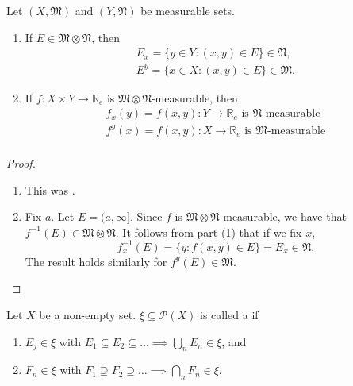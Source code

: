 \documentclass[notoc,notitlepage]{tufte-book}
\begin{document}
\begin{propo}\label{propo:component_wise_measurability_of_functions_and_sets}
  Let $(X, \mathfrak{M})$ and $(Y, \mathfrak{N})$ be measurable sets.
  \begin{enumerate}
    \item If $E \in \mathfrak{M} \otimes \mathfrak{N}$, then
      \begin{gather*}
        E_x = \{ y \in Y : (x, y) \in E \} \in \mathfrak{N}, \\
        E^y = \{ x \in X : (x, y) \in E \} \in \mathfrak{M}.
      \end{gather*}
    \item If $f : X \times Y \to \mathbb{R}_e$ is
      $\mathfrak{M} \otimes \mathfrak{N}$-measurable, then
      \begin{gather*}
        f_x(y) = f(x, y) : Y \to \mathbb{R}_e
          \text{ is } \mathfrak{N}\text{-measurable} \\
        f^y(x) = f(x, y) : X \to \mathbb{R}_e
          \text{ is } \mathfrak{M}\text{-measurable} \\
      \end{gather*}
  \end{enumerate}
\end{propo}

\begin{proof}
  \begin{enumerate}
    \item This was .
    \item Fix $a$. Let $E = (a, \infty]$.
      Since $f$ is $\mathfrak{M} \otimes \mathfrak{N}$-measurable,
      we have that $f^{-1}(E) \in \mathfrak{M} \otimes \mathfrak{N}$.
      It follows from part (1) that if we fix $x$,
      \begin{equation*}
        f_x^{-1}(E) = \{ y : f(x, y) \in E \} = E_x \in \mathfrak{N}.
      \end{equation*}
      The result holds similarly for $f^y(E) \in \mathfrak{M}$.
  \end{enumerate}
\end{proof}

\begin{defn}\label{defn:monotone_classes}
  Let $X$ be a non-empty set.
  $\xi \subseteq \mathcal{P}(X)$ is called a 
  if
  \begin{enumerate}
    \item $E_j \in \xi$ with $E_1 \subseteq E_2 \subseteq \hdots
      \implies \bigcup_{n} E_n \in \xi$, and
    \item $F_n \in \xi$ with $F_1 \supseteq F_2 \supseteq \hdots
      \implies \bigcap_{n} F_n \in \xi$.
  \end{enumerate}
\end{defn}
\end{document}
